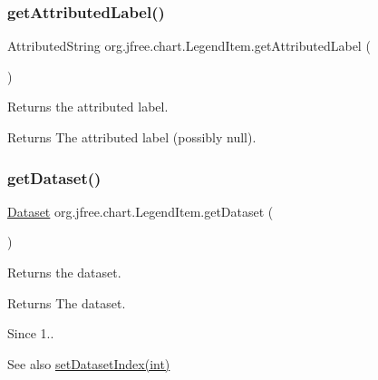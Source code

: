 \subsubsection{\texorpdfstring{get\+Attributed\+Label()}{getAttributedLabel()}}
{\footnotesize\ttfamily Attributed\+String org.\+jfree.\+chart.\+Legend\+Item.\+get\+Attributed\+Label (\begin{DoxyParamCaption}{ }\end{DoxyParamCaption})}

Returns the attributed label.

\begin{DoxyReturn}{Returns}
The attributed label (possibly {\ttfamily null}). 
\end{DoxyReturn}
\mbox{\label{classorg_1_1jfree_1_1chart_1_1_legend_item_a5213895f13ab94372d048ea13d2f0146}} 
\subsubsection{\texorpdfstring{get\+Dataset()}{getDataset()}}
{\footnotesize\ttfamily \mbox{\hyperlink{interfaceorg_1_1jfree_1_1data_1_1general_1_1_dataset}{Dataset}} org.\+jfree.\+chart.\+Legend\+Item.\+get\+Dataset (\begin{DoxyParamCaption}{ }\end{DoxyParamCaption})}

Returns the dataset.

\begin{DoxyReturn}{Returns}
The dataset.
\end{DoxyReturn}
\begin{DoxySince}{Since}
1..
\end{DoxySince}
\begin{DoxySeeAlso}{See also}
\mbox{\hyperlink{classorg_1_1jfree_1_1chart_1_1_legend_item_a34b68265023efe9e950bb9fa8cc927dc}{set\+Dataset\+Index(int)}} 
\end{DoxySeeAlso}
\mbox{\label{classorg_1_1jfree_1_1chart_1_1_legend_item_a211d17c1d0c314e7445cbd574cbafb41}} 
